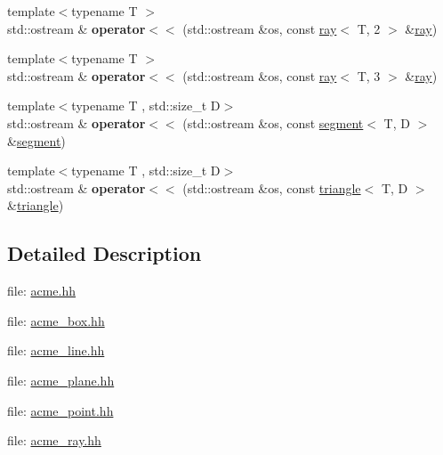 \begin{DoxyCompactItemize}
\item 
\mbox{\label{namespaceacme_a7674e6862c0b4dc4ee053906f9ac000b}} 
{\footnotesize template$<$typename T $>$ }\\std\+::ostream \& {\bfseries operator$<$$<$} (std\+::ostream \&os, const \hyperlink{classacme_1_1ray}{ray}$<$ T, 2 $>$ \&\hyperlink{classacme_1_1ray}{ray})
\item 
\mbox{\label{namespaceacme_a8e4c4c5a2909a07c6be7cd9b341bfd6a}} 
{\footnotesize template$<$typename T $>$ }\\std\+::ostream \& {\bfseries operator$<$$<$} (std\+::ostream \&os, const \hyperlink{classacme_1_1ray}{ray}$<$ T, 3 $>$ \&\hyperlink{classacme_1_1ray}{ray})
\item 
\mbox{\label{namespaceacme_a57a1dda522f330fb40bb206dce427297}} 
{\footnotesize template$<$typename T , std\+::size\+\_\+t D$>$ }\\std\+::ostream \& {\bfseries operator$<$$<$} (std\+::ostream \&os, const \hyperlink{classacme_1_1segment}{segment}$<$ T, D $>$ \&\hyperlink{classacme_1_1segment}{segment})
\item 
\mbox{\label{namespaceacme_a9e0b4489892523ceac270a9d7c8b932e}} 
{\footnotesize template$<$typename T , std\+::size\+\_\+t D$>$ }\\std\+::ostream \& {\bfseries operator$<$$<$} (std\+::ostream \&os, const \hyperlink{classacme_1_1triangle}{triangle}$<$ T, D $>$ \&\hyperlink{classacme_1_1triangle}{triangle})
\end{DoxyCompactItemize}


\subsection{Detailed Description}
file\+: \hyperlink{acme_8hh_source}{acme.\+hh}

file\+: \hyperlink{acme__box_8hh_source}{acme\+\_\+box.\+hh}

file\+: \hyperlink{acme__line_8hh_source}{acme\+\_\+line.\+hh}

file\+: \hyperlink{acme__plane_8hh_source}{acme\+\_\+plane.\+hh}

file\+: \hyperlink{acme__point_8hh_source}{acme\+\_\+point.\+hh}

file\+: \hyperlink{acme__ray_8hh_source}{acme\+\_\+ray.\+hh}

